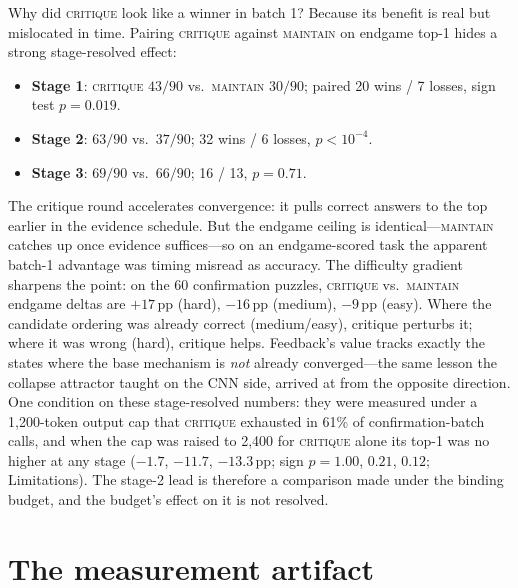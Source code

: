 \documentclass[10pt]{article}
\newcommand{\Mmaint}{\textsc{maintain}}
\newcommand{\Mcrit}{\textsc{critique}}
\begin{document}
Why did \Mcrit{} look like a winner in batch 1? Because its benefit is
real but mislocated in time. Pairing \Mcrit{} against \Mmaint{} on
endgame top-1 hides a strong stage-resolved effect:
\begin{itemize}
\item \textbf{Stage 1}: \Mcrit{} $43/90$ vs.\ \Mmaint{} $30/90$;
  paired 20 wins / 7 losses, sign test $p = 0.019$.
\item \textbf{Stage 2}: $63/90$ vs.\ $37/90$; 32 wins / 6 losses,
  $p < 10^{-4}$.
\item \textbf{Stage 3}: $69/90$ vs.\ $66/90$; 16 / 13, $p = 0.71$.
\end{itemize}
The critique round accelerates convergence: it pulls correct answers to
the top earlier in the evidence schedule. But the endgame ceiling is
identical---\Mmaint{} catches up once evidence suffices---so on an
endgame-scored task the apparent batch-1 advantage was timing misread as
accuracy. The difficulty gradient sharpens the point: on the 60
confirmation puzzles, \Mcrit{} vs.\ \Mmaint{} endgame deltas are $+17$\,pp
(hard), $-16$\,pp (medium), $-9$\,pp (easy). Where the candidate ordering
was already correct (medium/easy), critique perturbs it; where it was
wrong (hard), critique helps. Feedback's value tracks exactly the
states where the base mechanism is \emph{not} already converged---the
same lesson the collapse attractor taught on the CNN side, arrived at
from the opposite direction. One condition on these stage-resolved
numbers: they were measured under a 1{,}200-token output cap that
\Mcrit{} exhausted in 61\% of confirmation-batch calls, and when the cap
was raised to 2{,}400 for \Mcrit{} alone its top-1 was no higher at any
stage ($-1.7$, $-11.7$, $-13.3$\,pp; sign $p = 1.00$, $0.21$, $0.12$;
Limitations). The stage-2 lead is therefore a comparison made under the
binding budget, and the budget's effect on it is not resolved.

\section{The measurement artifact}
\label{sec:artifact}
\end{document}
